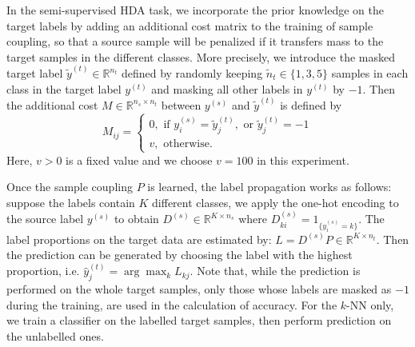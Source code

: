 In the semi-supervised HDA task, we incorporate the prior knowledge on the target labels by adding an
additional cost matrix to the training of sample coupling, so that a source sample
will be penalized if it transfers mass to the target samples in the different classes.
More precisely, we introduce the masked target label $\tilde{y}^{(t)} \in \mathbb R^{n_t}$
defined by randomly keeping $\tilde{n}_t \in \{1,3,5\}$ samples in each class
in the target label $y^{(t)}$ and masking all other labels in $y^{(t)}$ by $-1$.
Then the additional cost $M \in \mathbb R^{n_s \times n_t}$ between $y^{(s)}$
and $\tilde{y}^{(t)}$ is defined by
\begin{equation}
  M_{ij} =
  \begin{cases}
    0, \text{ if } y^{(s)}_i = \tilde{y}^{(t)}_j, \text{ or } \tilde{y}^{(t)}_j = -1 \\
    v, \text{ otherwise}.
  \end{cases}
\end{equation}
Here, $v > 0$ is a fixed value and we choose $v = 100$ in this experiment.

Once the sample coupling $P$ is learned, the label propagation works as follows:
suppose the labels contain $K$ different classes,
we apply the one-hot encoding to the source label $y^{(s)}$ to obtain
$D^{(s)} \in \mathbb R^{K \times n_s}$ where $D^{(s)}_{ki} = 1_{\{y^{(s)}_i = k\}}$.
The label proportions on the target data are estimated by:
$L = D^{(s)} P \in \mathbb R^{K \times n_t}$. Then the prediction can be generated by choosing the
label with the highest proportion, i.e. $\widehat{y}^{(t)}_j = \arg\max_k L_{kj}$.
Note that, while the prediction is performed on the whole target samples,
only those whose labels are masked as $-1$ during the
training, are used in the calculation of accuracy. For the $k$-NN only,
we train a classifier on the labelled target samples, then perform prediction on the unlabelled ones.

